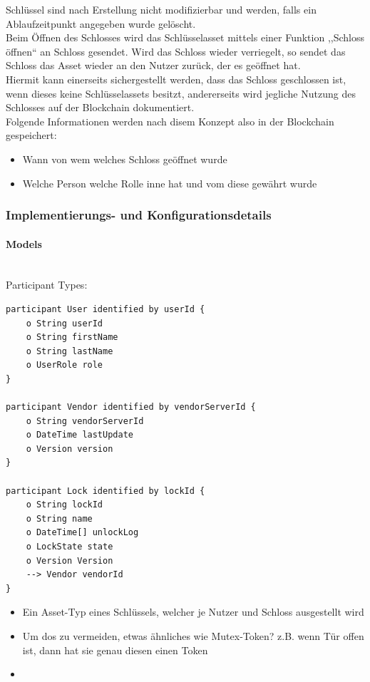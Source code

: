         Schlüssel sind nach Erstellung nicht modifizierbar und werden, falls ein Ablaufzeitpunkt angegeben wurde gelöscht. \\
        Beim Öffnen des Schlosses wird das Schlüsselasset mittels einer Funktion ,,Schloss öffnen`` an Schloss gesendet.
        Wird das Schloss wieder verriegelt, so sendet das Schloss das Asset wieder an den Nutzer zurück, der es geöffnet hat. \\
        Hiermit kann einerseits sichergestellt werden, dass das Schloss geschlossen ist, wenn dieses keine Schlüsselassets besitzt, andererseits wird jegliche Nutzung des Schlosses auf der Blockchain dokumentiert. 
        \medskip\\
        \noindent Folgende Informationen werden nach disem Konzept also in der Blockchain gespeichert:
        \begin{itemize}[noitemsep]
            \item Wann von wem welches Schloss geöffnet wurde
            \item Welche Person welche Rolle inne hat und vom diese gewährt wurde
        \end{itemize}
        
    \subsubsection{Implementierungs- und Konfigurationsdetails}
        \paragraph{\textrm{Models}}\hspace{0cm}\smallskip\\
            Participant Types:
            \begin{lstlisting}[caption={Participant Types},label=prototype_pariticipants,captionpos=b]
participant User identified by userId {
    o String userId
    o String firstName
    o String lastName
	o UserRole role
}

participant Vendor identified by vendorServerId {
	o String vendorServerId
	o DateTime lastUpdate
	o Version version
}

participant Lock identified by lockId {
    o String lockId
    o String name
    o DateTime[] unlockLog
	o LockState state
	o Version Version
	--> Vendor vendorId
}
        \end{lstlisting}
            
            \begin{itemize}[noitemsep]
                \item Ein Asset-Typ eines Schlüssels, welcher je Nutzer und Schloss ausgestellt wird
                \item Um \gls{dos} zu vermeiden, etwas ähnliches wie Mutex-Token? z.B. wenn Tür offen ist, dann hat sie genau diesen einen Token
                \item 
            \end{itemize}
            
